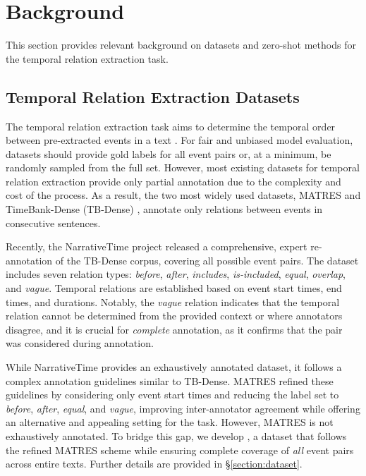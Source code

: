 \section{Background}
\label{section:background}
This section provides relevant background on datasets and zero-shot methods for the temporal relation extraction task.


\subsection{Temporal Relation Extraction Datasets}
\label{section:background:datasets}

The temporal relation extraction task aims to determine the temporal order between pre-extracted events in a text \cite{pustejovsky2003timeml}. For fair and unbiased model evaluation, datasets should provide gold labels for all event pairs or, at a minimum, be randomly sampled from the full set. However, most existing datasets for temporal relation extraction provide only partial annotation due to the complexity and cost of the process. As a result, the two most widely used datasets, MATRES \cite{ning-etal-2018-multi} and TimeBank-Dense (TB-Dense) \cite{chambers-etal-2014-dense}, annotate only relations between events in consecutive sentences.


Recently, the NarrativeTime project \cite{rogers-etal-2024-narrativetime} released a comprehensive, expert re-annotation of the TB-Dense corpus, covering all possible event pairs. The dataset includes seven relation types: \textit{before}, \textit{after}, \textit{includes}, \textit{is-included}, \textit{equal}, \textit{overlap}, and \textit{vague}. Temporal relations are established based on event start times, end times, and durations. Notably, the \textit{vague} relation indicates that the temporal relation cannot be determined from the provided context or where annotators disagree, and it is crucial for \textit{complete} annotation, as it confirms that the pair was considered during annotation.

While NarrativeTime provides an exhaustively annotated dataset, it follows a complex annotation guidelines similar to TB-Dense. MATRES refined these guidelines by considering only event start times and reducing the label set to \textit{before}, \textit{after}, \textit{equal}, and \textit{vague}, improving inter-annotator agreement while offering an alternative and appealing setting for the task. However, MATRES is not exhaustively annotated. To bridge this gap, we develop \App{}, a dataset that follows the refined MATRES scheme while ensuring complete coverage of \textit{all} event pairs across entire texts. Further details are provided in §\ref{section:dataset}.


